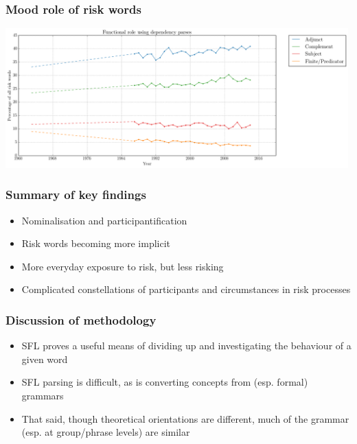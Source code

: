 \documentclass{beamer}       %
\begin{document}
\begin{frame}
    \frametitle{Mood role of risk words}
    \centering
    \includegraphics[width=0.99\textwidth]{../images/functional_role_using_dependency_parses}
\end{frame}


\begin{frame}
    \frametitle{Summary of key findings}
    
    \begin{itemize}
    \item Nominalisation and participantification
    \item Risk words becoming more implicit
    \item More everyday exposure to risk, but less risking
    \item Complicated constellations of participants and circumstances in risk processes
    \end{itemize}
\end{frame}

\begin{frame}
    \frametitle{Discussion of methodology}
    
    \begin{itemize}
    \item SFL proves a useful means of dividing up and investigating the behaviour of a given word
    \item SFL parsing is difficult, as is converting concepts from (esp. formal) grammars
    \item That said, though theoretical orientations are different, much of the grammar (esp. at group\slash phrase levels) are similar
    \end{itemize}
\end{frame}
\end{document}
